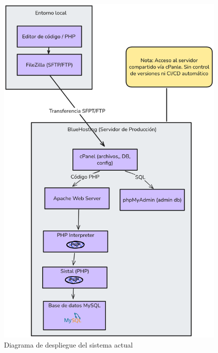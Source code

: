 \begin{figure}[htbp]
    \centering
    \includegraphics[height=0.9\textheight]{figuras/diagramas-actuales/diagrama-de-despliegue}
    \caption{Diagrama de despliegue del sistema actual}
    \label{fig:diagrama-despliegue-actual}
\end{figure}

